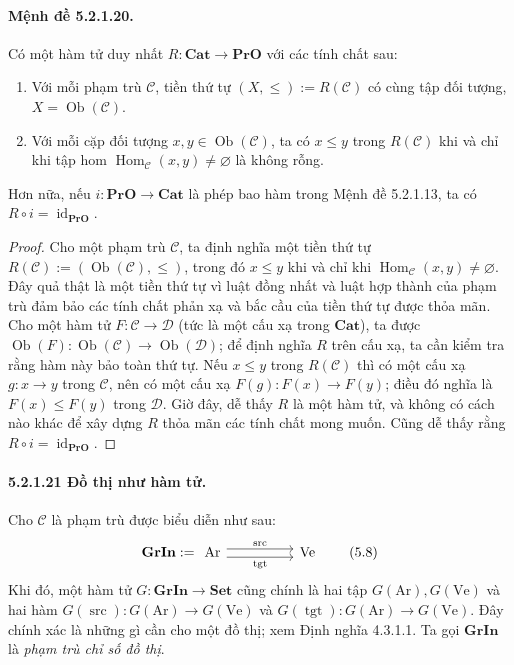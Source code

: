 \paragraph{Mệnh đề 5.2.1.20.} Có một hàm tử duy nhất $R:\mathbf{Cat}\to\mathbf{PrO}$ với các tính chất sau:
\begin{enumerate}[label=\arabic*.]
\item Với mỗi phạm trù $\mathcal C$, tiền thứ tự $(X,\leq):=R(\mathcal C)$ có cùng tập đối tượng, $X=\operatorname{Ob}(\mathcal C)$.
\item Với mỗi cặp đối tượng $x,y\in\operatorname{Ob}(\mathcal C)$, ta có $x\leq y$ trong $R(\mathcal C)$ khi và chỉ khi tập hom $\operatorname{Hom}_{\mathcal C}(x,y)\ne\varnothing$ là không rỗng.
\end{enumerate}
Hơn nữa, nếu $i:\mathbf{PrO}\to\mathbf{Cat}$ là phép bao hàm trong Mệnh đề 5.2.1.13, ta có $R\circ i=\operatorname{id}_{\mathbf{PrO}}$.
\begin{proof}Cho một phạm trù $\mathcal C$, ta định nghĩa một tiền thứ tự $R(\mathcal C):=(\operatorname{Ob}(\mathcal C),\leq)$, trong đó $x\leq y$ khi và chỉ khi $\operatorname{Hom}_{\mathcal C}(x,y)\ne\varnothing$. Đây quả thật là một tiền thứ tự vì luật đồng nhất và luật hợp thành của phạm trù đảm bảo các tính chất phản xạ và bắc cầu của tiền thứ tự được thỏa mãn. Cho một hàm tử $F:\mathcal C\to\mathcal D$ (tức là một cấu xạ trong $\mathbf{Cat}$), ta được $\operatorname{Ob}(F):\operatorname{Ob}(\mathcal C)\to\operatorname{Ob}(\mathcal D)$; để định nghĩa $R$ trên cấu xạ, ta cần kiểm tra rằng hàm này bảo toàn thứ tự. Nếu $x\leq y$ trong $R(\mathcal C)$ thì có một cấu xạ $g:x\to y$ trong $\mathcal C$, nên có một cấu xạ $F(g):F(x)\to F(y)$; điều đó nghĩa là $F(x)\leq F(y)$ trong $\mathcal D$. Giờ đây, dễ thấy $R$ là một hàm tử, và không có cách nào khác để xây dựng $R$ thỏa mãn các tính chất mong muốn. Cũng dễ thấy rằng $R\circ i=\operatorname{id}_{\mathbf{PrO}}$.\end{proof}
\paragraph{5.2.1.21 Đồ thị như hàm tử.} Cho $\mathcal C$ là phạm trù được biểu diễn như sau:
\begin{equation*}\mathbf{GrIn}:=\begin{tikzcd}[column sep=huge]\mathrm{Ar}\arrow[r,shift left=3pt,"\operatorname{src}"]\arrow[r,shift right=3pt,"\operatorname{tgt}"']&\mathrm{Ve}\end{tikzcd}\tag{5.8}\end{equation*}
Khi đó, một hàm tử $G:\mathbf{GrIn}\to\mathbf{Set}$ cũng chính là hai tập $G(\mathrm{Ar}),G(\mathrm{Ve})$ và hai hàm $G(\operatorname{src}):G(\mathrm{Ar})\to G(\mathrm{Ve})$ và $G(\operatorname{tgt}):G(\mathrm{Ar})\to G(\mathrm{Ve})$. Đây chính xác là những gì cần cho một đồ thị; xem Định nghĩa 4.3.1.1. Ta gọi $\mathbf{GrIn}$ là \emph{phạm trù chỉ số đồ thị}.
